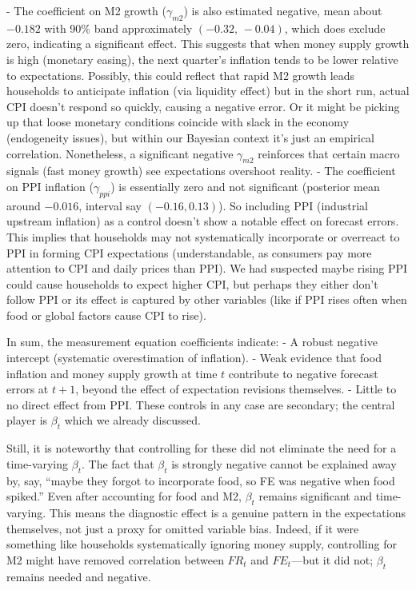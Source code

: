 \documentclass[12pt]{article}
\begin{document}
- The coefficient on M2 growth ($\gamma_{m2}$) is also estimated negative, mean about $-0.182$ with 90\% band approximately $(-0.32,\,-0.04)$, which does exclude zero, indicating a significant effect. This suggests that when money supply growth is high (monetary easing), the next quarter's inflation tends to be lower relative to expectations. Possibly, this could reflect that rapid M2 growth leads households to anticipate inflation (via liquidity effect) but in the short run, actual CPI doesn't respond so quickly, causing a negative error. Or it might be picking up that loose monetary conditions coincide with slack in the economy (endogeneity issues), but within our Bayesian context it's just an empirical correlation. Nonetheless, a significant negative $\gamma_{m2}$ reinforces that certain macro signals (fast money growth) see expectations overshoot reality.
- The coefficient on PPI inflation ($\gamma_{ppi}$) is essentially zero and not significant (posterior mean around $-0.016$, interval say $(-0.16, 0.13)$). So including PPI (industrial upstream inflation) as a control doesn't show a notable effect on forecast errors. This implies that households may not systematically incorporate or overreact to PPI in forming CPI expectations (understandable, as consumers pay more attention to CPI and daily prices than PPI). We had suspected maybe rising PPI could cause households to expect higher CPI, but perhaps they either don't follow PPI or its effect is captured by other variables (like if PPI rises often when food or global factors cause CPI to rise).

In sum, the measurement equation coefficients indicate:
- A robust negative intercept (systematic overestimation of inflation).
- Weak evidence that food inflation and money supply growth at time $t$ contribute to negative forecast errors at $t+1$, beyond the effect of expectation revisions themselves.
- Little to no direct effect from PPI.
These controls in any case are secondary; the central player is $\beta_t$ which we already discussed.

Still, it is noteworthy that controlling for these did not eliminate the need for a time-varying $\beta_t$. The fact that $\beta_t$ is strongly negative cannot be explained away by, say, “maybe they forgot to incorporate food, so FE was negative when food spiked.” Even after accounting for food and M2, $\beta_t$ remains significant and time-varying. This means the diagnostic effect is a genuine pattern in the expectations themselves, not just a proxy for omitted variable bias. Indeed, if it were something like households systematically ignoring money supply, controlling for M2 might have removed correlation between $FR_t$ and $FE_t$—but it did not; $\beta_t$ remains needed and negative.
\end{document}
